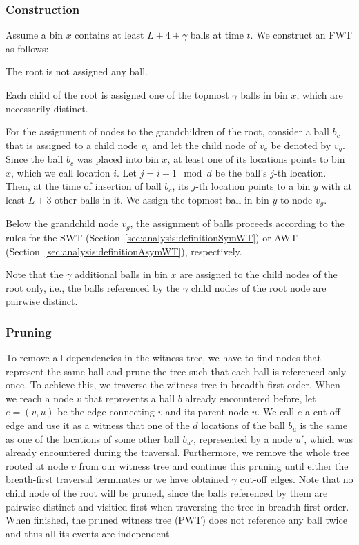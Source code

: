 \documentclass[a4paper,12pt]{article}
\begin{document}
\subsubsection{Construction}
\label{sec:analysis:constructionFullWT}
Assume a bin $x$ contains at least $L+4+\gamma$ balls at time $t$. We construct an FWT as follows:
\begin{compactitem}
\item The root is not assigned any ball.
\item Each child of the root is assigned one of the topmost $\gamma$ balls in bin $x$, which are necessarily distinct.
\item For the assignment of nodes to the grandchildren of the root, consider a ball $b_c$ that is assigned to a child node $v_c$ and let the child node of $v_c$ be denoted by $v_g$. Since the ball $b_c$ was placed into bin $x$, at least one of its locations points to bin $x$, which we call location $i$. Let $j = i+1\mod d$ be the ball's $j$-th location. Then, at the time of insertion of ball $b_c$, its $j$-th location points to a bin $y$ with at least $L+3$ other balls in it. We assign the topmost ball in bin $y$ to node $v_g$.
\item Below the grandchild node $v_g$, the assignment of balls proceeds according to the rules for the SWT (Section~\ref{sec:analysis:definitionSymWT}) or AWT (Section~\ref{sec:analysis:definitionAsymWT}), respectively.
\end{compactitem}
Note that the $\gamma$ additional balls in bin $x$ are assigned to the child nodes of the root only, i.e., the balls referenced by the $\gamma$ child nodes of the root node are pairwise distinct.

\subsubsection{Pruning}
\label{sec:analysis:pruningFullWT}
To remove all dependencies in the witness tree, we have to find nodes that represent the same ball and prune the tree such that each ball is referenced only once. To achieve this, we traverse the witness tree in breadth-first order. When we reach a node $v$ that represents a ball $b$ already encountered before, let $e = (v,u)$ be the edge connecting $v$ and its parent node $u$. We call $e$ a cut-off edge and use it as a witness that one of the $d$ locations of the ball $b_u$ is the same as one of the locations of some other ball $b_{u'}$, represented by a node $u'$, which was already encountered during the traversal. Furthermore, we remove the whole tree rooted at node $v$ from our witness tree and continue this pruning until either the breath-first traversal terminates or we have obtained $\gamma$ cut-off edges. Note that no child node of the root will be pruned, since the balls referenced by them are pairwise distinct and visitied first when traversing the tree in breadth-first order. When finished, the pruned witness tree (PWT) does not reference any ball twice and thus all its events are independent. 
\end{document}
